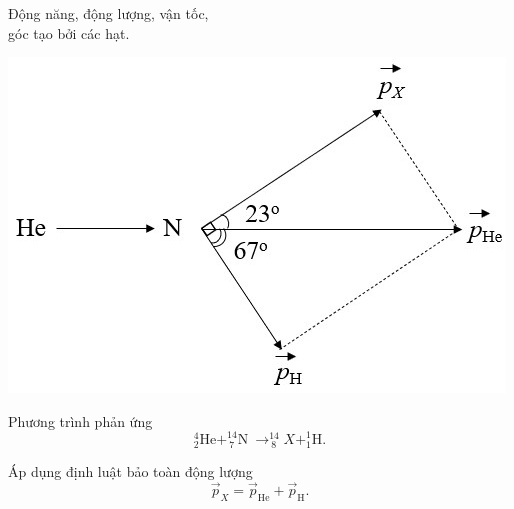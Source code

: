 \begin{dang}{Động năng, động lượng, vận tốc,\\ góc tạo bởi các hạt.}
{		\begin{center}
			\includegraphics[scale=0.8]{../figs/VN12-PH-47-L-028-2-H2.jpg}
		\end{center}
		
		Phương trình phản ứng
		\begin{equation*}
			^4_2\text{He} + ^{14}_{\ 7}\text{N}\ \rightarrow ^{14}_{\ 8} X + ^1_1\text{H}.
		\end{equation*}
		
		Áp dụng định luật bảo toàn động lượng
		\begin{equation*}
			\vec{p}_X=\vec{p}_\text{He}+\vec{p}_\text{H}.
		\end{equation*}
		
}
\end{dang}
